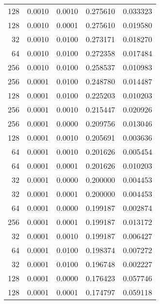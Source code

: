 \begin{tabular}{rrrrr}
 128 &  0.0010 &  0.0010 &  0.275610 &  0.033323 \\
 128 &  0.0010 &  0.0001 &  0.275610 &  0.019580 \\
  32 &  0.0010 &  0.0100 &  0.273171 &  0.018270 \\
  64 &  0.0010 &  0.0100 &  0.272358 &  0.017484 \\
 256 &  0.0010 &  0.0100 &  0.258537 &  0.010983 \\
 256 &  0.0001 &  0.0100 &  0.248780 &  0.014487 \\
 128 &  0.0001 &  0.0100 &  0.225203 &  0.010203 \\
 256 &  0.0001 &  0.0010 &  0.215447 &  0.020926 \\
 256 &  0.0001 &  0.0000 &  0.209756 &  0.013046 \\
 128 &  0.0001 &  0.0010 &  0.205691 &  0.003636 \\
  64 &  0.0001 &  0.0010 &  0.201626 &  0.005454 \\
  64 &  0.0001 &  0.0001 &  0.201626 &  0.010203 \\
  32 &  0.0001 &  0.0000 &  0.200000 &  0.004453 \\
  32 &  0.0001 &  0.0001 &  0.200000 &  0.004453 \\
  64 &  0.0001 &  0.0000 &  0.199187 &  0.002874 \\
 256 &  0.0001 &  0.0001 &  0.199187 &  0.013172 \\
  32 &  0.0001 &  0.0010 &  0.199187 &  0.006427 \\
  64 &  0.0001 &  0.0100 &  0.198374 &  0.007272 \\
  32 &  0.0001 &  0.0100 &  0.196748 &  0.002227 \\
 128 &  0.0001 &  0.0000 &  0.176423 &  0.057746 \\
 128 &  0.0001 &  0.0001 &  0.174797 &  0.059118 \\
\bottomrule
\end{tabular}
